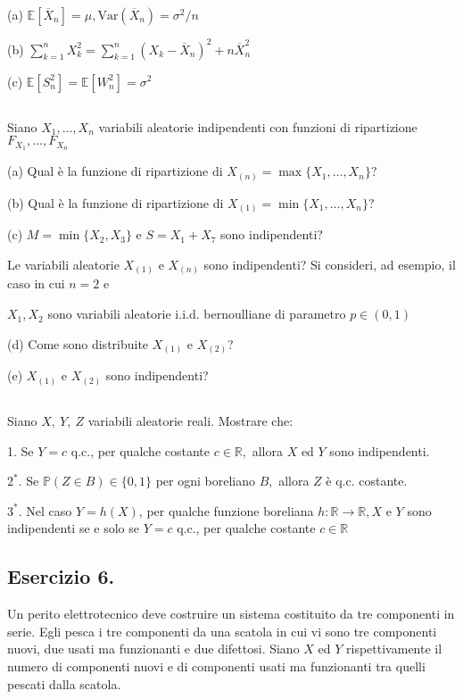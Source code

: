 (a) $\mathbb{E}[\overline{X}_{n}] =\mu ,\mathrm{Var}(\overline{X}_{n}) =\sigma ^{2} /n$

(b) $\sum _{k=1}^{n} X_{k}^{2} =\sum _{k=1}^{n}( X_{k} -\overline{X}_{n})^{2} +n\overline{X}_{n}^{2}$

(c) $\mathbb{E}\left[ S_{n}^{2}\right] =\mathbb{E}\left[ W_{n}^{2}\right] =\sigma ^{2}$
\subsection{}

Siano $X_{1} ,\dotsc ,X_{n}$ variabili aleatorie indipendenti con funzioni di ripartizione $F_{X_{1}} ,\dotsc ,F_{X_{n}}$

(a) Qual è la funzione di ripartizione di $X_{(n)} =\max\{X_{1} ,\dotsc ,X_{n}\} ?$

(b) Qual è la funzione di ripartizione di $X_{(1)} =\min\{X_{1} ,\dotsc ,X_{n}\} ?$

(c) $M=\min\{X_{2} ,X_{3}\}$ e $S=X_{1} +X_{7}$ sono indipendenti?

Le variabili aleatorie $X_{(1)}$ e $X_{(n)}$ sono indipendenti? Si consideri, ad esempio, il caso in cui $n=2$ e

$X_{1} ,X_{2}$ sono variabili aleatorie i.i.d. bernoulliane di parametro $p\in (0,1)$

(d) Come sono distribuite $X_{(1)}$ e $X_{(2)}$?

(e) $X_{(1)}$ e $X_{(2)}$ sono indipendenti?
\subsection{}

Siano $X,\ Y,\ Z$ variabili aleatorie reali. Mostrare che:

1. Se $Y=c$ q.c., per qualche costante $c\in \mathbb{R} ,$ allora $X$ ed $Y$ sono indipendenti.

$2^{*} .$ Se $\mathbb{P} (Z\in B)\in \{0,1\}$ per ogni boreliano $B,$ allora $Z$ è q.c. costante.

$3^{*} .$ Nel caso $Y=h(X)$, per qualche funzione boreliana $h:\mathbb{R}\rightarrow \mathbb{R} ,X$ e $Y$ sono indipendenti se e solo se $Y=c$ q.c., per qualche costante $c\in \mathbb{R}$
\subsection{Esercizio 6.}

Un perito elettrotecnico deve costruire un sistema costituito da tre componenti in serie. Egli pesca i tre componenti da una scatola in cui vi sono tre componenti nuovi, due usati ma funzionanti e due difettosi. Siano $X$ ed $Y$ rispettivamente il numero di componenti nuovi e di componenti usati ma funzionanti tra quelli pescati dalla scatola.

